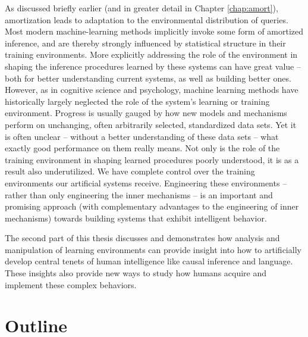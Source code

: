 As discussed briefly earlier (and in greater detail in Chapter \ref{chap:amort}), amortization leads to adaptation to the environmental distribution of queries. Most modern machine-learning methods implicitly invoke some form of amortized inference, and are thereby strongly influenced by statistical structure in their training environments. More explicitly addressing the role of the environment in shaping the inference procedures learned by these systems can have great value -- both for better understanding current systems, as well as building better ones. However, as in cognitive science and psychology, machine learning methods have historically largely neglected the role of the system's learning or training environment. Progress is usually gauged by how new models and mechanisms perform on unchanging, often arbitrarily selected, standardized data sets. Yet it is often unclear -- without a better understanding of these data sets -- what exactly good performance on them really means. Not only is the role of the training environment in shaping learned procedures poorly understood, it is as a result also underutilized. We have complete control over the training environments our artificial systems receive. Engineering these environments -- rather than only engineering the inner mechanisms -- is an important and promising approach (with complementary advantages to the engineering of inner mechanisms) towards building systems that exhibit intelligent behavior.

The second part of this thesis discusses and demonstrates how analysis and manipulation of learning environments can provide insight into how to artificially develop central tenets of human intelligence like causal inference and language. These insights also provide new ways to study how humans acquire and implement these complex behaviors.


\section*{Outline}

